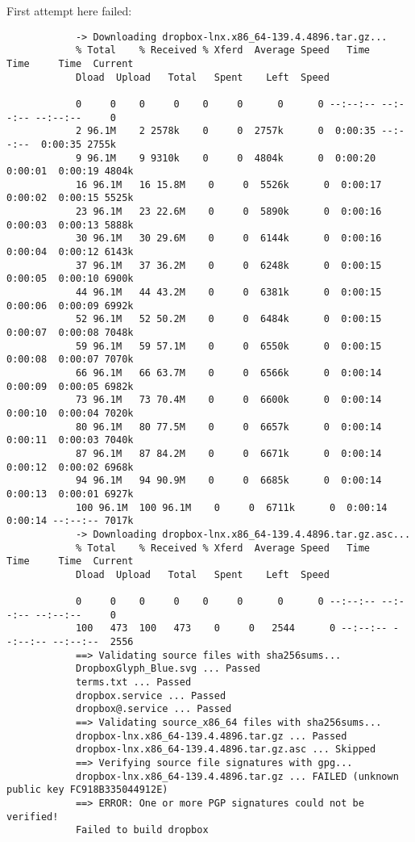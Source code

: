\documentclass[]{scrartcl}
\begin{document}
	First attempt here failed:
	\begin{small}
		\begin{verbatim}
			-> Downloading dropbox-lnx.x86_64-139.4.4896.tar.gz...
			% Total    % Received % Xferd  Average Speed   Time    Time     Time  Current
			Dload  Upload   Total   Spent    Left  Speed
			
			0     0    0     0    0     0      0      0 --:--:-- --:--:-- --:--:--     0
			2 96.1M    2 2578k    0     0  2757k      0  0:00:35 --:--:--  0:00:35 2755k
			9 96.1M    9 9310k    0     0  4804k      0  0:00:20  0:00:01  0:00:19 4804k
			16 96.1M   16 15.8M    0     0  5526k      0  0:00:17  0:00:02  0:00:15 5525k
			23 96.1M   23 22.6M    0     0  5890k      0  0:00:16  0:00:03  0:00:13 5888k
			30 96.1M   30 29.6M    0     0  6144k      0  0:00:16  0:00:04  0:00:12 6143k
			37 96.1M   37 36.2M    0     0  6248k      0  0:00:15  0:00:05  0:00:10 6900k
			44 96.1M   44 43.2M    0     0  6381k      0  0:00:15  0:00:06  0:00:09 6992k
			52 96.1M   52 50.2M    0     0  6484k      0  0:00:15  0:00:07  0:00:08 7048k
			59 96.1M   59 57.1M    0     0  6550k      0  0:00:15  0:00:08  0:00:07 7070k
			66 96.1M   66 63.7M    0     0  6566k      0  0:00:14  0:00:09  0:00:05 6982k
			73 96.1M   73 70.4M    0     0  6600k      0  0:00:14  0:00:10  0:00:04 7020k
			80 96.1M   80 77.5M    0     0  6657k      0  0:00:14  0:00:11  0:00:03 7040k
			87 96.1M   87 84.2M    0     0  6671k      0  0:00:14  0:00:12  0:00:02 6968k
			94 96.1M   94 90.9M    0     0  6685k      0  0:00:14  0:00:13  0:00:01 6927k
			100 96.1M  100 96.1M    0     0  6711k      0  0:00:14  0:00:14 --:--:-- 7017k
			-> Downloading dropbox-lnx.x86_64-139.4.4896.tar.gz.asc...
			% Total    % Received % Xferd  Average Speed   Time    Time     Time  Current
			Dload  Upload   Total   Spent    Left  Speed
			
			0     0    0     0    0     0      0      0 --:--:-- --:--:-- --:--:--     0
			100   473  100   473    0     0   2544      0 --:--:-- --:--:-- --:--:--  2556
			==> Validating source files with sha256sums...
			DropboxGlyph_Blue.svg ... Passed
			terms.txt ... Passed
			dropbox.service ... Passed
			dropbox@.service ... Passed
			==> Validating source_x86_64 files with sha256sums...
			dropbox-lnx.x86_64-139.4.4896.tar.gz ... Passed
			dropbox-lnx.x86_64-139.4.4896.tar.gz.asc ... Skipped
			==> Verifying source file signatures with gpg...
			dropbox-lnx.x86_64-139.4.4896.tar.gz ... FAILED (unknown public key FC918B335044912E)
			==> ERROR: One or more PGP signatures could not be verified!
			Failed to build dropbox
		\end{verbatim}
	\end{small}
	
\end{document}
